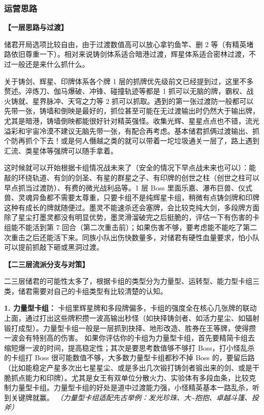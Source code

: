 ﻿\documentclass[12pt, a4paper]{article}
\begin{document}
\subsubsection{运营思路}

\textbf{【一层思路与过渡】}

储君开局选项比较自由，由于过渡数值高可以放心拿钓鱼竿、删 2 等（有精英堵路依旧尊重一下）。相对来说铸剑体系适合暗港过渡，辉星体系适合密林过渡，不过一般还是来什么抓什么。

关于铸剑、辉星、印牌体系各个牌 1 层的抓牌优先级前文已经提到过，这里不多赘述。淬炼刀、伽马爆破、冲锋、碰撞轨迹等都是 1 抓可以无脑的牌，霸权、战火铸就、星界脉冲、天穹之力等 2 抓可以抓取。遇到的第一张过渡防一般都可以先带一张，铸墙和倒映是最好的，抓位甚至可能在无过渡输出时仍然大于输出牌，尤其是暗港，铸墙倒映都能很好针对精英强怪。收集光辉、星星点点也不错，流光溢彩和宇宙冷漠不建议无脑先带一张，有配合再考虑。基本储君抓俩过渡输出、抓个防再抓个下去！或是何人僭越之类的就可以带着一坨垃圾通关一层了，路上遇到汇流、类星体等强牌可以随手拿着。

这时候就可以开始根据卡组情况战未来了（安全的情况下早点战未来也可以）：能敲的环绕轨道、有剑的剑圣、有星的群星之子、有印牌的创世之柱（创世之柱可以早点抓当过渡防）、有费的微光战利品等。1 层 Boss 里面乐嘉、瀑布巨兽、仪式兽、灵魂异鱼都不需要太尊重，只要卡组不是纯辉星卡组，稍微有点铸剑牌和印牌这种有成长的牌就随便过。墨灵不能速杀还会塞牌，会比较克纯大剑，多段牌方面除了星尘打墨灵都没有明显优势，墨灵滑溜破完之后挺脆的，评估一下有伤害的卡组能不能活到第 7 回合（第二次重击前）；如果伤害不够，要考虑能不能吃了第二次重击之后还能活下来。同族小队出伤快数量多，对储君有硬性血量要求，怕小队可以提前抓敲下砸或黑洞过渡。

\textbf{【二三层流派分支与对策】}

二三层储君的可能性太多了，根据卡组的类型分为力量型、运转型、能力型卡组三类，储君需要对自己的卡组类型有比较清楚的认知。

\textbf{1. 力量型卡组：}
卡组里辉星牌和多段牌偏多，卡组的强度全在核心几张牌的联动上面，通过打出这些牌积攒一波高输出秒怪（如抉择铸剑者、如活力星尘、如辐射锻打成型）。力量型卡组一般是一层抓到抉择、地形改造、胜券在王等牌，使得攒一波会有特别高的伤害。
如果你评估你的卡组为力量型卡组，首先要精简卡组去缩短爆一波的时间，提高稳定性；其次是要思考数值够不够打 Boss，打小怪乱杀的卡组打 Boss 很可能数值不够，大多数力量型卡组都秒不掉 Boss 的，要留后路（比如能稳定产星多次出七星星尘、或是多出几次锻打铸剑者锻出来的剑、或是干脆抓点能力和印牌）。尤其是女王有双单位分散火力、实验体有多段血条，比较克制力量型卡组。力量型卡组的好处是道中过渡能力强，小怪精英基本一路乱杀，听到关键牌就赢。
\textit{（力量型卡组适配先古举例：发光珍珠、大\textasciitilde 抱抱、卓越斗篷、投斧）}
\end{document}

